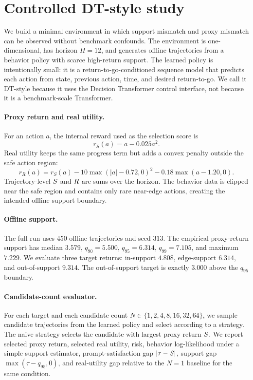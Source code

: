 \section{Controlled DT-style study}
\label{sec:method}

We build a minimal environment in which support mismatch and proxy mismatch can be observed without benchmark confounds. The environment is one-dimensional, has horizon $H=12$, and generates offline trajectories from a behavior policy with scarce high-return support. The learned policy is intentionally small: it is a return-to-go-conditioned sequence model that predicts each action from state, previous action, time, and desired return-to-go. We call it DT-style because it uses the Decision Transformer control interface, not because it is a benchmark-scale Transformer.

\paragraph{Proxy return and real utility.}
For an action $a$, the internal reward used as the selection score is
\[
  r_S(a) = a - 0.025a^2.
\]
Real utility keeps the same progress term but adds a convex penalty outside the safe action region:
\[
  r_R(a) =
  r_S(a)
  - 10\max(|a|-0.72,0)^2
  - 0.18\max(a-1.20,0).
\]
Trajectory-level $S$ and $R$ are sums over the horizon. The behavior data is clipped near the safe region and contains only rare near-edge actions, creating the intended offline support boundary.

\paragraph{Offline support.}
The full run uses $450$ offline trajectories and seed $313$. The empirical proxy-return support has median $3.579$, $q_{90}=5.500$, $q_{95}=6.314$, $q_{99}=7.105$, and maximum $7.229$. We evaluate three target returns: in-support $4.808$, edge-support $6.314$, and out-of-support $9.314$. The out-of-support target is exactly $3.000$ above the $q_{95}$ boundary.

\paragraph{Candidate-count evaluator.}
For each target and each candidate count \(N \in \{1,2,4,8,16,32,64\}\), we sample candidate trajectories from the learned policy and select according to a strategy. The naive strategy selects the candidate with largest proxy return $S$. We report selected proxy return, selected real utility, risk, behavior log-likelihood under a simple support estimator, prompt-satisfaction gap $|\tau-S|$, support gap $\max(\tau-q_{95},0)$, and real-utility gap relative to the \(N=1\) baseline for the same condition.


